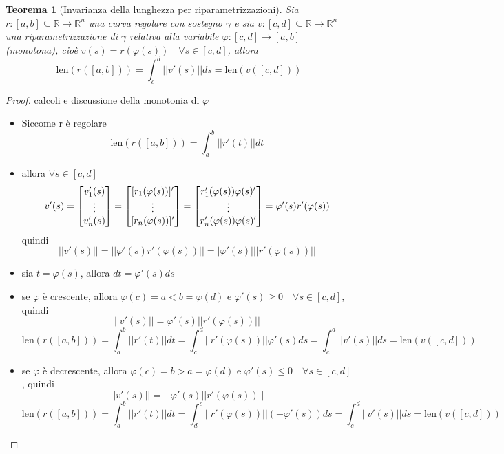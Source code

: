 \documentclass[12pt, a4paper]{article}
\theoremstyle{break}
\newtheorem{theorem}{Teorema} %
\begin{document}
\newpage
\begin{theorem} [Invarianza della lunghezza per riparametrizzazioni]
	Sia $r: [a,b] \subseteq \mathbb{R} \to \mathbb{R}^n$ una curva
	regolare con sostegno $\gamma$ e sia $v: [c,d] \subseteq \mathbb{R}
		\to \mathbb{R}^n$ una riparametrizzazione di $\gamma$ relativa
	alla variabile $ \varphi : [c,d] \to [a,b]$ (monotona), cioè
	$v(s) = r(\varphi (s)) \quad \forall s \in [c,d]$, allora
	\[
		\text{len}(r([a,b])) = \int_{c}^{d} || v'(s) || ds =
		\text{len}(v([c,d])) \]
\end{theorem}
\begin{proof} calcoli e discussione della monotonia di $\varphi$
	\begin{itemize}
		\item Siccome r è regolare
			\[
				\text{len}(r([a,b])) = \int_{a}^{b} || r'(t) || dt
			\]
		\item allora $\forall s \in [c,d]$
			\[
				v'(s) =
				\begin{bmatrix}
					v_1'(s) \\
					\vdots  \\
					v_n'(s) \\
				\end{bmatrix}
				=
				\begin{bmatrix}
					[r_1(\varphi(s))]' \\
					\vdots             \\
					[r_n(\varphi(s))]' \\
				\end{bmatrix}
				=
				\begin{bmatrix}
					r_1'(\varphi(s))\varphi(s)' \\
					\vdots                      \\
					r_n'(\varphi(s))\varphi(s)' \\
				\end{bmatrix}
				= \varphi'(s) r'(\varphi(s))\\
			\]
			quindi
			\[
				||v'(s)|| = ||\varphi'(s) r'(\varphi(s))|| = |\varphi'(s)| ||
				r'(\varphi(s))||
			\]
		\item sia $t = \varphi(s)$, allora $ dt = \varphi'(s) ds$
		\item se $\varphi$ è crescente, allora $\varphi(c) = a < b =
				\varphi(d)$ e $\varphi'(s) \geq 0 \quad \forall s \in [c,d]$, quindi
			\[
				||v'(s)|| = \varphi'(s) || r'(\varphi(s))||
			\]
			\[
				\text{len}(r([a,b])) =
				\int_{a}^{b} || r'(t) || dt =
				\int_{c}^{d} || r'(\varphi(s))|| \varphi'(s) ds =
				\int_{c}^{d} || v'(s) || ds =
				\text{len}(v([c,d]))
			\]
		\item se $\varphi$ è decrescente, allora $\varphi(c) = b > a =
				\varphi(d)$ e $\varphi'(s) \leq 0 \quad \forall s \in [c,d]$, quindi
			\[
				||v'(s)|| = -\varphi'(s) || r'(\varphi(s))||
			\]
			\[
				\text{len}(r([a,b])) =
				\int_{a}^{b} || r'(t) || dt =
				\int_{d}^{c} || r'(\varphi(s))|| (-\varphi'(s)) ds =
				\int_{c}^{d} || v'(s) || ds =
				\text{len}(v([c,d]))
			\]
	\end{itemize}
\end{proof}
\end{document}
